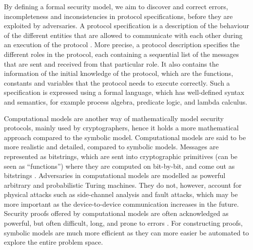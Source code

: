By defining a formal security model, we aim to discover and correct errors, incompleteness and inconsistencies in protocol specifications, before they are exploited by adversaries. A protocol specification is a description of the behaviour of the different entities that are allowed to communicate with each other during an execution of the protocol \cite{cremers2005operational}. More precise, a protocol description specifies the different roles in the protocol, each containing a sequential list of the messages that are sent and received from that particular role. It also contains the information of the initial knowledge of the protocol, which are the functions, constants and variables that the protocol needs to execute correctly. Such a specification is expressed using a formal language, which has well-defined syntax and semantics, for example process algebra, predicate logic, and lambda calculus. 

Computational models are another way of mathematically model security protocols, mainly used by cryptographers, hence it holds a more mathematical approach compared to the symbolic model. Computational models are said to be more realistic and detailed, compared to symbolic models. Messages are represented as bitstrings, which are sent into cryptographic primitives (can be seen as ``functions'') where they are computed on bit-by-bit, and come out as bitstrings \cite{blanchet2012security}. Adversaries in computational models are modelled as powerful arbitrary and probabilistic Turing machines. They do not, however, account for physical attacks such as side-channel analysis and fault attacks, which may be more important as the device-to-device communication increases in the future. Security proofs offered by computational models are often acknowledged as powerful, but often difficult, long, and prone to errors \cite{cortier2011survey}. For constructing proofs, symbolic models are much more efficient as they can more easier be automated to explore the entire problem space.


